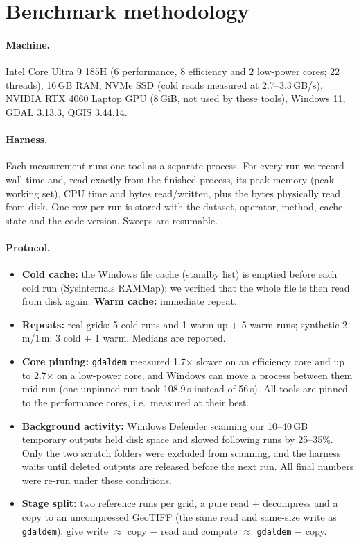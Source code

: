 ﻿\documentclass[11pt,a4paper]{article}
\begin{document}
\section{Benchmark methodology}
\paragraph{Machine.} Intel Core Ultra 9 185H (6 performance, 8 efficiency and 2 low-power cores; 22 threads), 16\,GB
RAM, NVMe SSD (cold reads measured at 2.7--3.3\,GB/s), NVIDIA RTX 4060 Laptop GPU (8\,GiB, not used by these tools), Windows 11,
GDAL 3.13.3, QGIS 3.44.14.

\paragraph{Harness.} Each measurement runs one tool as a separate process. For every run we record wall time and,
read exactly from the finished process, its peak memory (peak working set), CPU time and bytes read/written, plus
the bytes physically read from disk. One row per run is stored with the dataset, operator, method, cache state and
the code version. Sweeps are resumable.

\paragraph{Protocol.}
\begin{itemize}
  \item \textbf{Cold cache:} the Windows file cache (standby list) is emptied before each cold run (Sysinternals
  RAMMap); we verified that the whole file is then read from disk again. \textbf{Warm cache:} immediate repeat.
  \item \textbf{Repeats:} real grids: 5 cold runs and 1 warm-up + 5 warm runs; synthetic 2\,m/1\,m: 3 cold + 1 warm.
  Medians are reported.
  \item \textbf{Core pinning:} \texttt{gdaldem} measured 1.7$\times$ slower on an efficiency core and up to
  2.7$\times$ on a low-power core, and Windows can move a process between them mid-run (one unpinned run took
  108.9\,s instead of 56\,s). All tools are pinned to the performance cores, i.e.\ measured at their best.
  \item \textbf{Background activity:} Windows Defender scanning our 10--40\,GB temporary outputs held disk space and
  slowed following runs by 25--35\%. Only the two scratch folders were excluded from scanning, and the harness waits
  until deleted outputs are released before the next run. All final numbers were re-run under these conditions.
  \item \textbf{Stage split:} two reference runs per grid, a pure read + decompress and a copy to an uncompressed
  GeoTIFF (the same read and same-size write as \texttt{gdaldem}), give write $\approx$ copy $-$ read and
  compute $\approx$ \texttt{gdaldem} $-$ copy.
\end{itemize}
\end{document}
